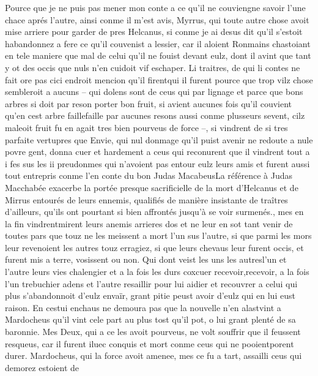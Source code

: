 \documentclass{article}
\begin{document}
\begin{pages}
            
\pstart Pource que je ne puis pas mener mon conte a ce qu’il ne couviengne savoir l’une chace 
   aprés l’autre, ainsi conme il m’est avis, Myrrus, qui toute autre chose avoit mise arriere 
   pour garder de pres Helcanus, si conme je ai desus dit qu’il s’estoit 
   habandonnez a fere ce qu’il couvenist a lessier, 
   car il aloient Ronmains chastoiant en tele maniere que mal de celui qu’il ne fouist devant eulz, 
   dont il avint que tant y ot des occis que nuls n’en cuidoit vif eschaper. Li traitres, de qui li contes ne fait ore 
      pas cici endroit mencion 
   qu’il firentqui il furent pource que trop vilz chose 
   sembleroit a aucuns – qui dolens sont de ceus qui par lignage et parce que bons arbres si doit par reson porter bon fruit, si avient 
   aucunes fois qu’il couvient qu’en cest arbre faillefaille par aucunes 
   resons aussi conme plusseurs sevent, cilz maleoit fruit fu en agait tres bien pourveus de force –, si vindrent de si 
   tres parfaite vertupres que Envie, qui nul donmage qu’il puist avenir ne redoute a nule povre gent, donna cuer et hardement a ceus qui 
   reconurent que il vindrent tout a i fes sus les ii preudonmes qui n’avoient pas entour eulz leurs amis et 
   furent aussi tout entrepris conme l’en conte du bon Judas MacabeusLa
   référence à Judas Macchabée exacerbe la portée presque sacrificielle de la mort d'Helcanus et de Mirrus entourés de leurs ennemis, 
   qualifiés de manière insistante de traîtres d'ailleurs, qu'ils ont pourtant si bien affrontés jusqu'à se voir surmenés., mes en la fin 
   vindrentmirent leurs anemis arrieres dos et ne leur en sot tant venir de 
   toutes pars que touz ne les meissent a mort l’un sus l’autre, si que parmi les mors leur revenoient les autres touz erragiez, 
   si que leurs chevaus leur furent occis, et furent mis a terre, vosissent ou non. Qui dont veist 
   les uns les autresl'un et l'autre leurs vies chalengier et a la fois 
   les durs coxcuer 
   recevoir,recevoir, a la fois 
   l’un trebuchier adens et l’autre resaillir pour lui aidier et recouvrer a celui qui plus s’abandonnoit d’eulz envaïr, 
   grant pitie peust avoir d’eulz qui en lui eust raison. \pend
\pstart En cestui enchaus ne demoura pas que la nouvelle n’en 
   alastvint a Mardocheus qu’il vint 
   cele part au plus tost qu’il pot, o lui grant plenté de sa baronnie. Mes Deux, qui a ce les avoit pourveus, ne volt souffrir que il 
   feussent resqueus, car il furent iluec conquis et mort conme ceus qui ne 
   pooientporent durer. Mardocheus, 
   qui la force avoit amenee, mes ce fu a tart, assailli ceus qui demorez estoient de 

\end{pages}
\end{document}
